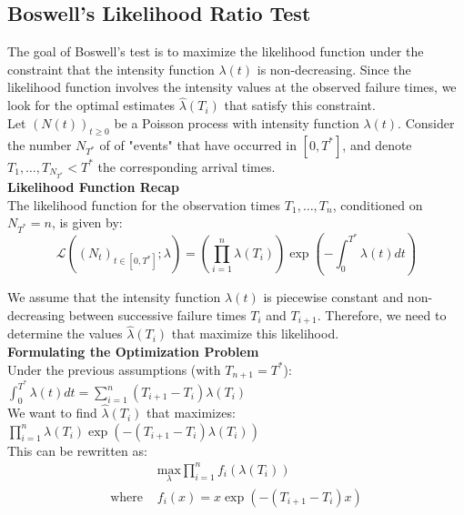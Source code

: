 \documentclass{journalstyle}
\begin{document}
\subsection{Boswell's Likelihood Ratio Test}

The goal of Boswell's test is to maximize the likelihood function under the constraint that the intensity function $\lambda(t)$ is non-decreasing.
Since the likelihood function involves the intensity values at the observed failure times, we look for the optimal estimates $\hat{\lambda}(T_i)$ that satisfy this constraint. \\

Let $(N(t))_{t \geq 0}$ be a Poisson process with intensity function $\lambda(t)$.
Consider the number $N_{T^*}$ of of "events" that have occurred in $[0, T^*]$, and denote $T_1, \ldots, T_{N_{T^*}} < T^*$ the corresponding arrival times. \\


\noindent\textbf{Likelihood Function Recap} \\
The likelihood function for the observation times $T_1, \ldots, T_n$, conditioned on $N_{T^*} = n$, is given by:
$$
\mathcal{L}((N_t)_{t \in [0, T^*]}; \lambda) = \left(\prod_{i=1}^n \lambda(T_i)\right) \exp\left(-\int_0^{T^*} \lambda(t) dt\right)
$$

We assume that the intensity function $\lambda(t)$ is piecewise constant and non-decreasing between successive failure times $T_{i}$ and $T_{i+1}$.
Therefore, we need to determine the values $\hat{\lambda}(T_i)$ that maximize this likelihood. \\

\noindent\textbf{Formulating the Optimization Problem} \\
Under the previous assumptions (with $T_{n+1} = T^*$): \\
$\int_0^{T^*} \lambda(t) dt = \sum_{i=1}^n (T_{i+1} - T_i) \lambda(T_i)$ \\

\noindent We want to find $\hat{\lambda}(T_i)$ that maximizes: \\
$\prod_{i=1}^{n} \lambda(T_i) \exp(-(T_{i+1} - T_i) \lambda(T_i))$ \\

This can be rewritten as: \\
\begin{equation*}
    \begin{split}
        &\underset{\lambda}{\text{max}} \prod_{i=1}^{n} f_i(\lambda(T_i)) \\
        \text{where } &f_i(x) = x \exp(-(T_{i+1} - T_i) x)
    \end{split}
    \label{eq:boswell_optimization_problem}
\end{equation*}
\end{document}
